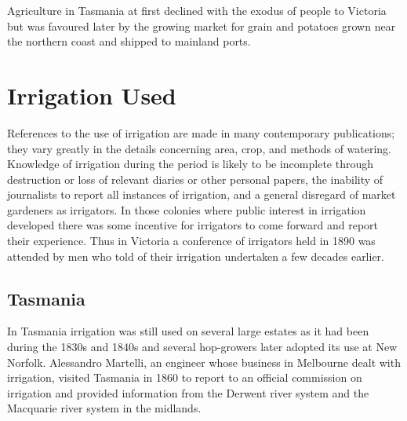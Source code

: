 Agriculture in Tasmania  at first declined with the
exodus of people to Victoria but was favoured later by the growing
market for grain and potatoes grown near the northern coast and
shipped to mainland ports.

\section*{Irrigation Used}

References to the use of irrigation are made in many contemporary
publications; they vary greatly in the details concerning area, crop,
and methods of watering.  Knowledge of irrigation during the period is
likely to be incomplete through destruction or loss of relevant
diaries or other personal papers, the inability of journalists to
report all instances of irrigation, and a general disregard of market
gardeners as irrigators.  In those colonies where public interest in
irrigation developed there was some incentive for irrigators to come
forward and report their experience.  Thus in Victoria a conference of
irrigators held in 1890 was attended by men who told of their
irrigation undertaken a few decades earlier.

\subsection*{Tasmania}

In Tasmania irrigation was still used on several large estates as it
had been during the 1830s and 1840s and several hop-growers later
adopted its use at New Norfolk.  Alessandro
Martelli,  an engineer whose business in Melbourne
dealt with irrigation, visited Tasmania in 1860 to report to an
official commission on irrigation and provided information from the
Derwent river  system and the Macquarie river
 system in the midlands.

